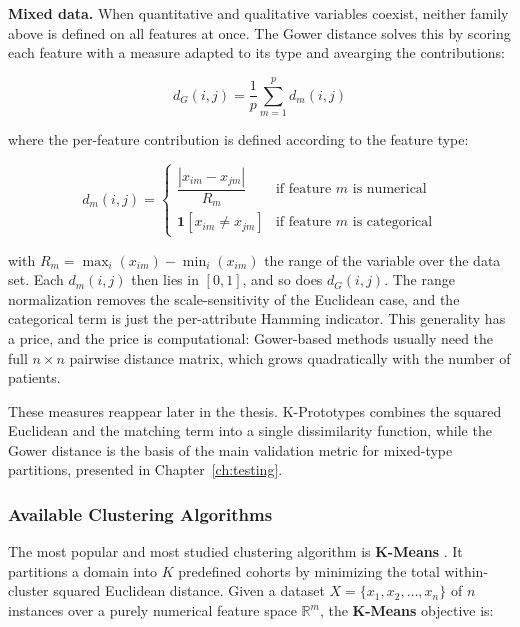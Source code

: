 \textbf{Mixed data.} When quantitative and qualitative variables coexist, neither family above is defined on all features at once. The Gower distance \cite{gower1971} solves this by scoring each feature with a measure adapted to its type and avearging the contributions:

\begin{equation}
    d_G(i, j) = \frac{1}{p} \sum_{m=1}^{p} d_m(i, j)
    \label{eq:gower}
\end{equation}

where the per-feature contribution is defined according to the feature type:

\begin{equation}
    d_m(i, j) =
    \begin{cases}
        \dfrac{|x_{im} - x_{jm}|}{R_m} & \text{if feature } m \text{ is numerical} \\[8pt]
        \mathbf{1}[x_{im} \neq x_{jm}]  & \text{if feature } m \text{ is categorical}
    \end{cases}
    \label{eq:gower_dm}
\end{equation}

with $R_m=\max_i(x_{im})-\min_i(x_{im})$ the range of the variable over the data set. Each $d_m(i,j)$ then lies in $[0,1]$, and so does $d_G(i,j)$. The range normalization removes the scale-sensitivity of the Euclidean case, and the categorical term is just the per-attribute Hamming indicator. This generality has a price, and the price is computational: Gower-based methods usually need the full $n \times n$ pairwise distance matrix, which grows quadratically with the number of patients.

These measures reappear later in the thesis. K-Prototypes combines the squared Euclidean and the matching term into a single dissimilarity function, while the Gower distance is the basis of the main validation metric for mixed-type partitions, presented in Chapter~\ref{ch:testing}.

\subsubsection*{Available Clustering Algorithms}

The most popular and most studied clustering algorithm is \textbf{K-Means} \cite{macqueen1967}. It partitions a domain into $K$ predefined cohorts by minimizing the total within-cluster squared Euclidean distance. Given a dataset $X = \{x_1, x_2, \ldots, x_n\}$ of $n$ instances over a purely numerical feature space $\mathbb{R}^m$, the \textbf{K-Means} objective is:

